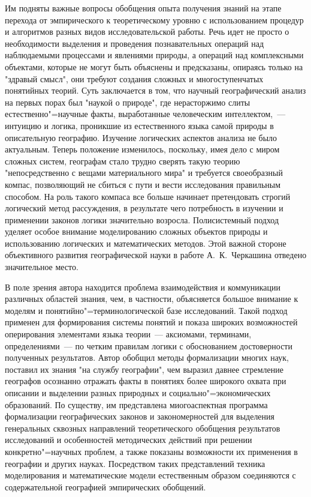 \documentclass[draft,openany,14pt]{extbook}
\begin{document}
Им подняты важные вопросы обобщения опыта получения знаний на этапе перехода от эмпирического к теоретическому уровню с использованием процедур и алгоритмов разных видов исследовательской работы. Речь идет не просто о необходимости выделения и проведения познавательных операций над наблюдаемыми процессами и явлениями природы, а операций над комплексными объектами, которые не могут быть объяснены и предсказаны, опираясь только на "здравый смысл", они требуют создания сложных и многоступенчатых понятийных теорий. Суть заключается в том, что научный географический анализ на первых порах был "наукой о природе", где нерасторжимо слиты естественно"=научные факты, выработанные человеческим интеллектом,~--- интуицию и логика, проникшие из естественного языка самой природы в описательную географию. Изучение логических аспектов анализа не было актуальным. Теперь положение изменилось, поскольку, имея дело с миром сложных систем, географам стало трудно сверять такую теорию "непосредственно с вещами материального мира" и требуется своеобразный компас, позволяющий не сбиться с пути и вести исследования правильным способом. На роль такого компаса все больше начинает претендовать строгий логический метод рассуждения, в результате чего потребность в изучении и применении законов логики значительно возросла. Полисистемный подход уделяет особое внимание моделированию сложных объектов природы и использованию логических и математических методов. Этой важной стороне объективного развития географической науки в работе А.~К.~Черкашина отведено значительное место.

В поле зрения автора находится проблема взаимодействия и коммуникации различных областей знания, чем, в частности, объясняется большое внимание к моделям и понятийно"=терминологической базе исследований. Такой подход применен для формирования системы понятий и показа широких возможностей оперирования элементами языка теории~--- аксиомами, терминами, определениями~--- по четким правилам логики с обоснованием достоверности полученных результатов. Автор обобщил методы формализации многих наук, поставил их знания "на службу географии", чем выразил давнее стремление географов осознанно отражать факты в понятиях более широкого охвата при описании и выделении разных природных и социально"=экономических образований. По существу, им представлена миогоаспектная программа формализации географических законов и закономерностей для выделения генеральных сквозных направлений теоретического обобщения результатов исследований и особенностей методических действий при решении конкретно"=научных проблем, а также показаны возможности их применения в географии и других науках. Посредством таких представлений техника моделирования и математические модели естественным образом соединяются с содержательной географией эмпирических обобщений.
\end{document}
